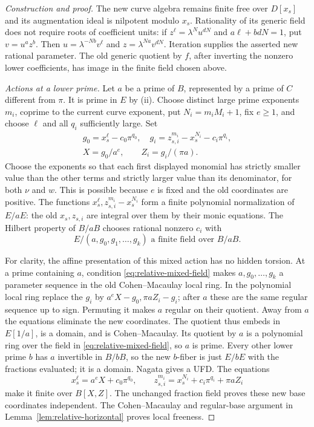 \documentclass[10pt,a4paper]{amsart}
\begin{document}
\begin{proof}[Construction and proof]
The new curve algebra remains finite free over \(D[x_s]\) and
its augmentation ideal is nilpotent modulo \(x_s\).  Rationality
of its generic field does not require roots of coefficient units:
if \(z^\ell=\lambda^N u^{dN}\) and
\(a\ell+b dN=1\), put \(v=u^a z^b\).  Then
\(u=\lambda^{-Nb}v^\ell\) and
\(z=\lambda^{Na}v^{dN}\).  Iteration supplies the asserted new
rational parameter.  The old generic quotient by \(f\), after
inverting the nonzero lower coefficients, has image in the finite
field chosen above.

\smallskip\noindent\emph{Actions at a lower prime.}
Let \(a\) be a prime of \(B\), represented by a prime of \(C\)
different from \(\pi\).  It is prime in \(E\) by (ii).
Choose distinct large prime exponents \(m_i\), coprime to the
current curve exponent, put \(N_i=m_iM_i+1\), fix \(e\ge1\),
and choose \(\ell\) and all \(q_i\) sufficiently large.  Set
\begin{equation}\label{eq:relative-mixed}
\begin{gathered}
g_0=x_s^\ell-c_0\pi^{q_0},\quad
 g_i=z_{s,i}^{m_i}-x_s^{N_i}-c_i\pi^{q_i},\\
 X=g_0/a^e,\qquad Z_i=g_i/(\pi a).
\end{gathered}
\end{equation}
Choose the exponents so that each first displayed monomial has
strictly smaller value than the other terms and strictly larger
value than its denominator, for both \(\nu\) and \(w\).
This is possible because \(e\) is fixed and the old coordinates
are positive.  The functions
\(x_s^\ell,z_{s,i}^{m_i}-x_s^{N_i}\) form a finite polynomial
normalization of \(E/aE\): the old \(x_s,z_{s,i}\) are integral
over them by their monic equations.  The Hilbert property of
\(B/aB\) chooses rational nonzero \(c_i\) with
\begin{equation}\label{eq:relative-mixed-field}
E/(a,g_0,g_1,\ldots,g_k)\text{ a finite field over }B/aB.
\end{equation}

For clarity, the affine presentation of this mixed action has no
hidden torsion.  At a prime containing \(a\), condition
\eqref{eq:relative-mixed-field} makes
\(a,g_0,\ldots,g_k\) a parameter sequence in the old
Cohen--Macaulay local ring.  In the polynomial local ring replace
the \(g_i\) by \(a^eX-g_0,\pi aZ_i-g_i\); after \(a\)
these are the same regular sequence up to sign.  Permuting it
makes \(a\) regular on their quotient.  Away from \(a\) the
equations eliminate the new coordinates.  The quotient thus
embeds in \(E[1/a]\), is a domain, and is Cohen--Macaulay.  Its
quotient by \(a\) is a polynomial ring over the field in
\eqref{eq:relative-mixed-field}, so \(a\) is prime.  Every other
lower prime \(b\) has \(a\) invertible in \(B/bB\), so the
new \(b\)-fiber is just \(E/bE\) with the fractions evaluated;
it is a domain.  Nagata gives a UFD.  The equations
\[
 x_s^\ell=a^eX+c_0\pi^{q_0},\qquad
 z_{s,i}^{m_i}=x_s^{N_i}+c_i\pi^{q_i}+\pi aZ_i
\]
make it finite over \(B[X,Z]\).  The unchanged fraction field
proves these new base coordinates independent.  The
Cohen--Macaulay and regular-base argument in
Lemma~\ref{lem:relative-horizontal} proves local freeness.


\end{proof}
\end{document}
